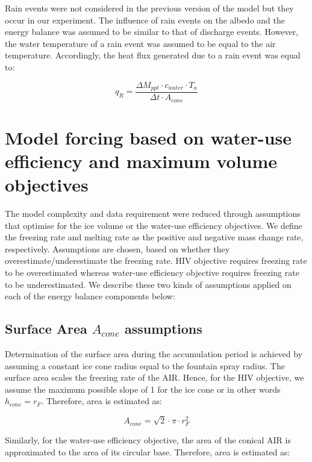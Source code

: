 \documentclass[tc, manuscript]{copernicus}
\begin{document}
Rain events were not considered in the previous version of the model but they occur in our experiment. The
influence of rain events on the albedo and the energy balance was assumed to be similar to that of discharge
events. However, the water temperature of a rain event was assumed to be equal to the air temperature.
Accordingly, the heat flux generated due to a rain event was equal to:

\begin{equation}
  q_{R} = \frac{\Delta M_{ppt} \cdot c_{water} \cdot T_{a}}{\Delta t \cdot A_{cone}}
\end{equation}

\section{Model forcing based on water-use efficiency and maximum volume objectives} \label{sec:SEB}

The model complexity and data requirement \citep{balasubramanianInfluenceMeteorologicalConditions2022} were
reduced through assumptions that optimise for the ice volume or the water-use efficiency objectives. We define
the freezing rate and melting rate as the positive and negative mass change rate, respectively. Assumptions are
chosen, based on whether they overestimate/underestimate the freezing rate. HIV objective requires freezing rate
to be overestimated whereas water-use efficiency objective requires freezing rate to be underestimated. We
describe these two kinds of assumptions applied on each of the energy balance components below: 

\subsection{Surface Area $A_{cone}$ assumptions}

Determination of the surface area during the accumulation period is achieved by assuming a constant ice cone
radius equal to the fountain spray radius. The surface area scales the freezing rate of the AIR. Hence, for the
HIV objective, we assume the maximum possible slope of 1 for the ice cone or in other words $h_{cone} = r_{F}$.
Therefore, area is estimated as:  

\begin{equation} A_{cone} =\sqrt{2} \cdot \pi \cdot r_{F}^2  \end{equation}

Similarly, for the water-use efficiency objective, the area of the conical AIR is approximated to the area of
its circular base. Therefore, area is estimated as:
\end{document}
